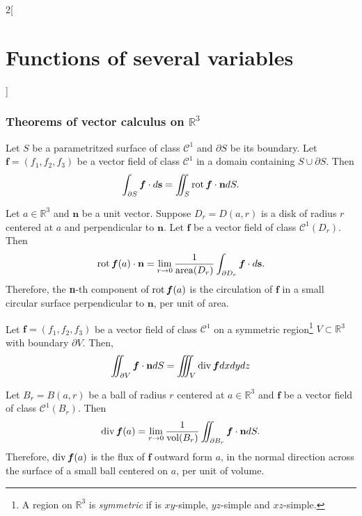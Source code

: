 \documentclass[class=article,10pt,crop=false]{standalone}
\begin{document}
\begin{multicols}{2}[\section{Functions of several variables}]
\subsubsection*{Theorems of vector calculus on \texorpdfstring{$\mathbb{R}^3$}{R3}}
\begin{theorem}
Let $S$ be a parametritzed surface of class $\mathcal{C}^1$ and $\partial S$ be its boundary. Let $\boldsymbol{f}=(f_1,f_2,f_3)$ be a vector field of class $\mathcal{C}^1$ in a domain containing $S\cup\partial S$. Then $$\int_{\partial S}\boldsymbol{f}\cdot d\textbf{s}=\iint_S\operatorname{rot}\boldsymbol{f}\cdot\textbf{n} dS.$$
\end{theorem}
\begin{corollary}
Let $a\in\mathbb{R}^3$ and $\textbf{n}$ be a unit vector. Suppose $D_r=D(a,r)$ is a disk of radius $r$ centered at $a$ and perpendicular to $\textbf{n}$. Let $\boldsymbol{f}$ be a vector field of class $\mathcal{C}^1(D_r)$. Then $$\operatorname{rot}\boldsymbol{f}(a)\cdot\textbf{n}=\lim_{r\to 0}\frac{1}{\text{area}(D_r)}\int_{\partial D_r}\boldsymbol{f}\cdot d\textbf{s}.$$ Therefore, the \textbf{n}-th component of $\operatorname{rot}\boldsymbol{f}(a)$ is the circulation of $\boldsymbol{f}$ in a small circular surface perpendicular to $\textbf{n}$, per unit of area.
\end{corollary}
\begin{theorem}
Let $\boldsymbol{f}=(f_1,f_2,f_3)$ be a vector field of class $\mathcal{C}^1$ on a symmetric region\footnote{A region on $\mathbb{R}^3$ is \textit{symmetric} if is $xy$-simple, $yz$-simple and $xz$-simple.} $V\subset\mathbb{R}^3$ with boundary $\partial V$. Then, $$\iint_{\partial V}\boldsymbol{f}\cdot\textbf{n} dS=\iiint_V\operatorname{div}\boldsymbol{f}dxdydz$$
\end{theorem}\pagebreak
\begin{corollary}
Let $B_r=B(a,r)$ be a ball of radius $r$ centered at $a\in\mathbb{R}^3$ and $\boldsymbol{f}$ be a vector field of class $\mathcal{C}^1(B_r)$. Then $$\operatorname{div}\boldsymbol{f}(a)=\lim_{r\to 0}\frac{1}{\text{vol}(B_r)}\iint_{\partial B_r}\boldsymbol{f}\cdot\textbf{n} dS.$$ Therefore, $\operatorname{div}\boldsymbol{f}(a)$ is the flux of $\boldsymbol{f}$ outward form $a$, in the normal direction across the surface of a small ball centered on $a$, per unit of volume.
\end{corollary}
\end{multicols}
\end{document}
